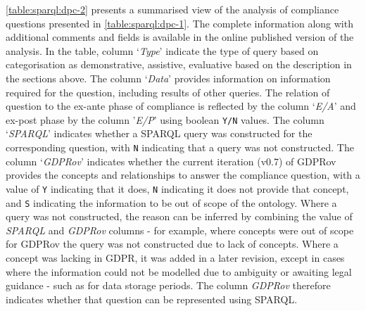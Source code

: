 \autoref{table:sparql:dpc-2} presents a summarised view of the analysis of compliance questions presented in \autoref{table:sparql:dpc-1}.
The complete information along with additional comments and fields is available in the online published version of the analysis.
In the table, column `\textit{Type}' indicate the type of query based on categorisation as demonstrative, assistive, evaluative based on the description in the sections above.
The column `\textit{Data}' provides information on information required for the question, including results of other queries.
The relation of question to the ex-ante phase of compliance is reflected by the column `\textit{E/A}' and ex-post phase by the column '\textit{E/P}' using boolean \texttt{Y/N} values.
The column `\textit{SPARQL}' indicates whether a SPARQL query was constructed for the corresponding question, with \texttt{N} indicating that a query was not constructed.
The column `\textit{GDPRov}' indicates whether the current iteration (v0.7) of GDPRov provides the concepts and relationships to answer the compliance question, with a value of \texttt{Y} indicating that it does, \texttt{N} indicating it does not provide that concept, and \texttt{S} indicating the information to be out of scope of the ontology.
Where a query was not constructed, the reason can be inferred by combining the value of \textit{SPARQL} and \textit{GDPRov} columns - for example, where concepts were out of scope for GDPRov the query was not constructed due to lack of concepts. Where a concept was lacking in GDPR, it was added in a later revision, except in cases where the information could not be modelled due to ambiguity or awaiting legal guidance - such as for data storage periods. The column \textit{GDPRov} therefore indicates whether that question can be represented using SPARQL.
